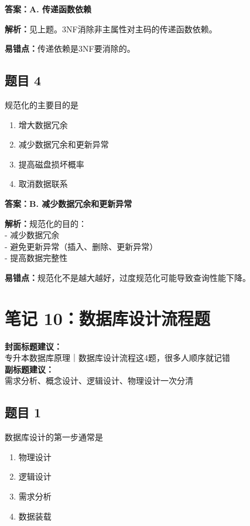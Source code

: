 \documentclass[12pt,a4paper]{ctexart}
\begin{document}
\begin{answerbox}
	\textbf{答案：A. 传递函数依赖}

	\textbf{解析：}见上题。3NF消除非主属性对主码的传递函数依赖。

	\textbf{易错点：}传递依赖是3NF要消除的。
\end{answerbox}

\subsection*{题目 4}
规范化的主要目的是
\begin{enumerate}[label=\Alph*.]
	\item 增大数据冗余
	\item 减少数据冗余和更新异常
	\item 提高磁盘损坏概率
	\item 取消数据联系
\end{enumerate}

\begin{answerbox}
	\textbf{答案：B. 减少数据冗余和更新异常}

	\textbf{解析：}规范化的目的：\\
	- 减少数据冗余\\
	- 避免更新异常（插入、删除、更新异常）\\
	- 提高数据完整性

	\textbf{易错点：}规范化不是越大越好，过度规范化可能导致查询性能下降。
\end{answerbox}

\newpage

\section{笔记 10：数据库设计流程题}
\begin{coverbox}
	\textbf{封面标题建议：}\\
	专升本数据库原理｜数据库设计流程这4题，很多人顺序就记错\\
	\textbf{副标题建议：}\\
	需求分析、概念设计、逻辑设计、物理设计一次分清
\end{coverbox}

\subsection*{题目 1}
数据库设计的第一步通常是
\begin{enumerate}[label=\Alph*.]
	\item 物理设计
	\item 逻辑设计
	\item 需求分析
	\item 数据装载
\end{enumerate}
\end{document}
